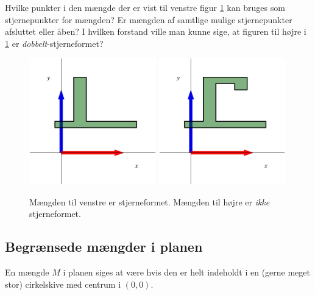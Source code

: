 \begin{exercise}
Hvilke punkter i den mængde der er vist til venstre figur \ref{figStjerner} kan bruges som stjernepunkter for mængden? Er mængden af samtlige mulige stjernepunkter afsluttet eller åben? I hvilken forstand ville man kunne sige, at figuren til højre i  \ref{figStjerner} er \emph{dobbelt}-stjerneformet?
\end{exercise}


\begin{figure}[h]
\centerline{\includegraphics[height=55mm]{plotStjerne.pdf} \quad \includegraphics[height=55mm]{plotStjerneNon.pdf}}
\begin{center}
\caption{Mængden til venstre er stjerneformet. Mængden til højre er \emph{ikke} stjerneformet.} \label{figStjerner}
\end{center}
\end{figure}

\subsection{Begrænsede mængder i planen}
\begin{definition}
En mængde $M$ i planen siges at være  hvis den er helt indeholdt i en (gerne meget stor) cirkelskive med centrum i $(0,0)$.
\end{definition}

